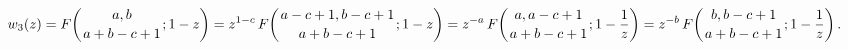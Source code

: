 \[w_{3}(z)=\mathop{F\/}\nolimits\!\left({a,b\atop a+b-c+1};1-z\right)=z^{1-c}%
\mathop{F\/}\nolimits\!\left({a-c+1,b-c+1\atop a+b-c+1};1-z\right)=z^{-a}%
\mathop{F\/}\nolimits\!\left({a,a-c+1\atop a+b-c+1};1-\frac{1}{z}\right)=z^{-b%
}\mathop{F\/}\nolimits\!\left({b,b-c+1\atop a+b-c+1};1-\frac{1}{z}\right).\]